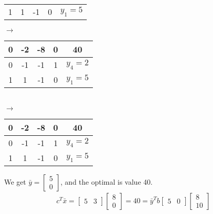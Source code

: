 \documentclass[12pt]{article}
\begin{document}
\begin{enumerate}
\begin{enumerate}
\begin{table}[H]
\begin{tabular}{cccc|c}
                                    1  & 1   & -1 & 0 & $y_1=5$
                              \end{tabular}$\rightarrow$
                              \begin{tabular}{cccc|c}
                                    0 & -2 & -8 & 0 & 40        \\
                                    \hline
                                    0 & -1 & -1 & 1 & $y_4 = 2$ \\
                                    1 & 1  & -1 & 0 & $y_1 = 5$
                              \end{tabular}\\
                              $\rightarrow$
                              \begin{tabular}{cccc|c}
                                    0 & -2 & -8 & 0 & 40        \\
                                    \hline
                                    0 & -1 & -1 & 1 & $y_4 = 2$ \\
                                    1 & 1  & -1 & 0 & $y_1 = 5$
                              \end{tabular}
                        \end{table}
                        We get $\bar{y} = \begin{bmatrix}
                                    5 \\ 0
                              \end{bmatrix}$, and the optimal is value 40.
                        \begin{align*}
                              c^T\bar{x} = \begin{bmatrix}
                                                 5 & 3
                                           \end{bmatrix}\begin{bmatrix} 8 \\0
                                                        \end{bmatrix} = 40 = \bar{y}^Tb\begin{bmatrix}
                                                                                             5 & 0
                                                                                       \end{bmatrix}\begin{bmatrix}
                                                                                                          8 \\10

\end{bmatrix}
\end{align*}
\end{enumerate}
\end{enumerate}
\end{document}

